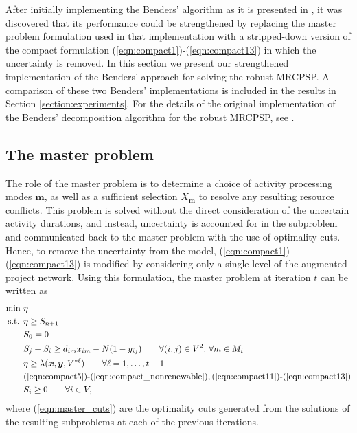 \documentclass[a4paper,abstracton]{scrartcl}
\begin{document}
After initially implementing the Benders' algorithm as it is presented in \cite{balouka2021robust}, it was discovered that its performance could be strengthened by replacing the master problem formulation used in that implementation with a stripped-down version of the compact formulation (\ref{eqn:compact1})-(\ref{eqn:compact13}) in which the uncertainty is removed. In this section we present our strengthened implementation of the Benders' approach for solving the robust MRCPSP. A comparison of these two Benders' implementations is included in the results in Section \ref{section:experiments}. For the details of the original implementation of the Benders' decomposition algorithm for the robust MRCPSP, see \cite{balouka2021robust}.

\subsection{The master problem}

The role of the master problem is to determine a choice of activity processing modes $\bm{m}$, as well as a sufficient selection $X_{\bm{m}}$ to resolve any resulting resource conflicts. This problem is solved without the direct consideration of the uncertain activity durations, and instead, uncertainty is accounted for in the subproblem and communicated back to the master problem with the use of optimality cuts. Hence, to remove the uncertainty from the model, (\ref{eqn:compact1})-(\ref{eqn:compact13}) is modified by considering only a single level of the augmented project network. Using this formulation, the master problem at iteration $t$ can be written as
\begin{align}
\min \ & \eta\label{eqn:master_first}\\
\text{s.t. } & \eta \geq S_{n+1}\\
	     & S_{0}=0\label{eqn:master2}\\
	     & S_{j} - S_{i} \geq \bar{d}_{im}x_{im} - N(1-y_{ij}) \qquad \forall (i,j)\in V^2,\,\forall m\in M_i\label{eqn:master3}\\
	     & \eta \geq \lambda(\bm{x}, \bm{y}, V^{*\ell}) \qquad \forall \ell=1,\dots,t-1\label{eqn:master_cuts}\\
	     & \textnormal{(\ref{eqn:compact5})-(\ref{eqn:compact_nonrenewable}),\,(\ref{eqn:compact11})-(\ref{eqn:compact13})}\\
	     & S_i\geq 0 \qquad \forall i\in V,\label{eqn:master_last}
\end{align}
where (\ref{eqn:master_cuts}) are the optimality cuts generated from the solutions of the resulting subproblems at each of the previous iterations.
\end{document}
